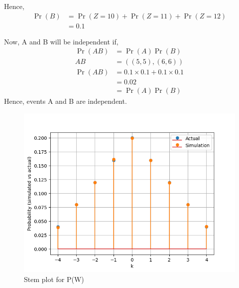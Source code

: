 \documentclass[]{article}
\begin{document}
Hence,
\begin{align}
\Pr(B) &= \Pr(Z=10) + \Pr(Z=11) + \Pr(Z=12)\\
&= 0.1
\end{align}

Now, A and B will be independent if,
\begin{align}
\Pr(AB) &= \Pr(A)\Pr(B)\\
AB &= ((5,5), (6,6)) \\
\Pr(AB) &= 0.1 \times 0.1 + 0.1 \times 0.1\\
&= 0.02\\
&= \Pr(A)\Pr(B)
\end{align}
Hence, events A and B are independent.
\begin{figure}
\includegraphics[width=\columnwidth]{./figs/fig.png}
\caption{Stem plot for P(W)}
\label{fig:exemplar/12/13/3/1/}
\end{figure}
\end{document}
